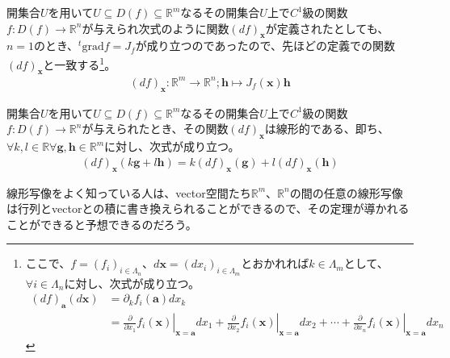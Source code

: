 \documentclass[dvipdfmx]{jsarticle}
\begin{document}
\begin{dfn}
開集合$U$を用いて$U \subseteq D(f) \subseteq \mathbb{R}^{m}$なるその開集合$U$上で$C^{1}$級の関数$f:D(f) \rightarrow \mathbb{R}^{n}$が与えられ次式のように関数$(df)_{\mathbf{x}}$が定義されたとしても、$n = 1$のとき、${}^{t}\mathrm{grad}f = J_{f}$が成り立つのであったので、先ほどの定義での関数$(df)_{\mathbf{x}}$と一致する\footnote{ここで、$f=\left(f_i\right)_{i\in \varLambda_{n}}$、$d\mathbf{x}=\left(d x_i\right)_{i\in \varLambda_{m}} $とおかれれば$k\in \varLambda_m $として、$\forall i\in \varLambda_n $に対し、次式が成り立つ。
\begin{align*}
\left( df\right)_{\mathbf{a}} \left(d\mathbf{x} \right) &=\partial_k f_i \left( \mathbf{a} \right) dx_k \\
&=\left. \frac{\partial }{\partial x_1} f_i \left(\mathbf{x}\right) \right|_{\mathbf{x}=\mathbf{a}} dx_1+\left. \frac{\partial }{\partial x_2} f_i \left(\mathbf{x}\right) \right|_{\mathbf{x}=\mathbf{a}} dx_2+\cdots +\left. \frac{\partial }{\partial x_n} f_i \left(\mathbf{x}\right) \right|_{\mathbf{x}=\mathbf{a}} dx_n
\end{align*}}。
\begin{align*}
(df)_{\mathbf{x}}:\mathbb{R}^{m} \rightarrow \mathbb{R}^{n};\mathbf{h} \mapsto J_{f}\left( \mathbf{x} \right)\mathbf{h}
\end{align*}
\end{dfn}
\begin{thm}\label{4.2.7.4}
開集合$U$を用いて$U \subseteq D(f) \subseteq \mathbb{R}^{m}$なるその開集合$U$上で$C^{1}$級の関数$f:D(f) \rightarrow \mathbb{R}^{n}$が与えられたとき、その関数$(df)_{\mathbf{x}}$は線形的である、即ち、$\forall k,l \in \mathbb{R}\forall\mathbf{g},\mathbf{h} \in \mathbb{R}^{m}$に対し、次式が成り立つ。
\begin{align*}
(df)_{\mathbf{x}}\left( k\mathbf{g} + l\mathbf{h} \right) = k(df)_{\mathbf{x}}\left( \mathbf{g} \right) + l(df)_{\mathbf{x}}\left( \mathbf{h} \right)
\end{align*}
\end{thm}\par
線形写像をよく知っている人は、vector空間たち$\mathbb{R}^{m}$、$\mathbb{R}^{n}$の間の任意の線形写像は行列とvectorとの積に書き換えられることができるので、その定理が導かれることができると予想できるのだろう。
\end{document}
